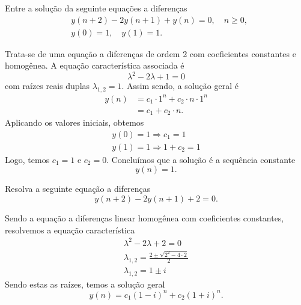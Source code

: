 \begin{exeresol}
  Entre a solução da seguinte equações a diferenças
  \begin{align}
    &y(n+2)-2y(n+1)+y(n) = 0,\quad n\geq 0,\\
    &y(0)=1,\quad y(1)=1.
  \end{align}
\end{exeresol}
\begin{resol}
  Trata-se de uma equação a diferenças de ordem 2 com coeficientes constantes e homogênea. A equação característica associada é
  \begin{equation}
    \lambda^2 - 2\lambda + 1 = 0
  \end{equation}
  com raízes reais duplas $\lambda_{1,2} = 1$. Assim sendo, a solução geral é
  \begin{align}
    y(n) &= c_1\cdot 1^n + c_2\cdot n \cdot 1^n\\
    &= c_1 + c_2\cdot n.
  \end{align}
  Aplicando os valores iniciais, obtemos
  \begin{align}
    y(0)=1 \Rightarrow c_1 = 1\\
    y(1)=1 \Rightarrow 1 + c_2 = 1
  \end{align}
  Logo, temos $c_1=1$ e $c_2=0$. Concluímos que a solução é a sequência constante
  \begin{equation}
    y(n)=1.
  \end{equation}
\end{resol}

\begin{exeresol}
  Resolva a seguinte equação a diferenças
  \begin{equation}
    y(n+2) - 2y(n+1) + 2 = 0.
  \end{equation}
\end{exeresol}
\begin{resol}
  Sendo a equação a diferenças linear homogênea com coeficientes constantes, resolvemos a equação característica
  \begin{gather}
    \lambda^2 - 2\lambda + 2 = 0\\
    \lambda_{1,2} = \frac{2\pm\sqrt{2^2-4\cdot 2}}{2}\\
    \lambda_{1,2} = 1\pm i
  \end{gather}
  Sendo estas as raízes, temos a solução geral
  \begin{equation}
    y(n) = c_1(1-i)^n + c_2(1+i)^n.
  \end{equation}
\end{resol}

